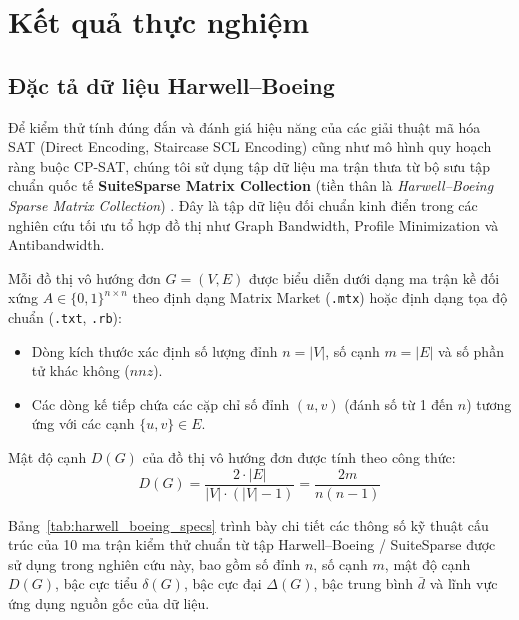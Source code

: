 \documentclass[a4paper,fleqn]{cas-sc}
\begin{document}
\section{Kết quả thực nghiệm}

\subsection{Đặc tả dữ liệu Harwell--Boeing}

Để kiểm thử tính đúng đắn và đánh giá hiệu năng của các giải thuật mã hóa SAT (Direct Encoding, Staircase SCL Encoding) cũng như mô hình quy hoạch ràng buộc CP-SAT, chúng tôi sử dụng tập dữ liệu ma trận thưa từ bộ sưu tập chuẩn quốc tế \textbf{SuiteSparse Matrix Collection} (tiền thân là \textit{Harwell--Boeing Sparse Matrix Collection}) \cite{harwellboeing}. Đây là tập dữ liệu đối chuẩn kinh điển trong các nghiên cứu tối ưu tổ hợp đồ thị như Graph Bandwidth, Profile Minimization và Antibandwidth.

Mỗi đồ thị vô hướng đơn $G = (V, E)$ được biểu diễn dưới dạng ma trận kề đối xứng $A \in \{0, 1\}^{n \times n}$ theo định dạng Matrix Market (\texttt{.mtx}) hoặc định dạng tọa độ chuẩn (\texttt{.txt}, \texttt{.rb}):
\begin{itemize}
    \item Dòng kích thước xác định số lượng đỉnh $n = |V|$, số cạnh $m = |E|$ và số phần tử khác không ($nnz$).
    \item Các dòng kế tiếp chứa các cặp chỉ số đỉnh $(u, v)$ (đánh số từ 1 đến $n$) tương ứng với các cạnh $\{u, v\} \in E$.
\end{itemize}

Mật độ cạnh $D(G)$ của đồ thị vô hướng đơn được tính theo công thức:
\begin{equation}
    D(G) = \frac{2 \cdot |E|}{|V| \cdot (|V| - 1)} = \frac{2m}{n(n - 1)}
\end{equation}

Bảng~\ref{tab:harwell_boeing_specs} trình bày chi tiết các thông số kỹ thuật cấu trúc của 10 ma trận kiểm thử chuẩn từ tập Harwell--Boeing / SuiteSparse được sử dụng trong nghiên cứu này, bao gồm số đỉnh $n$, số cạnh $m$, mật độ cạnh $D(G)$, bậc cực tiểu $\delta(G)$, bậc cực đại $\Delta(G)$, bậc trung bình $\bar{d}$ và lĩnh vực ứng dụng nguồn gốc của dữ liệu.
\end{document}
